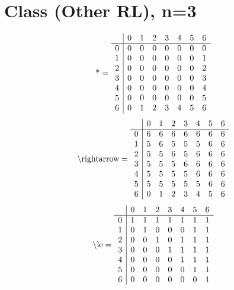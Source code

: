 \documentclass[11pt]{article}
\begin{document}
\section{Class (Other RL), n=3}
\[\text{*} = 
\begin{array}{r | r r r r r r r}
 & 0 & 1 & 2 & 3 & 4 & 5 & 6 \\ \hline
0 & 0 & 0 & 0 & 0 & 0 & 0 & 0 \\
1 & 0 & 0 & 0 & 0 & 0 & 0 & 1 \\
2 & 0 & 0 & 0 & 0 & 0 & 0 & 2 \\
3 & 0 & 0 & 0 & 0 & 0 & 0 & 3 \\
4 & 0 & 0 & 0 & 0 & 0 & 0 & 4 \\
5 & 0 & 0 & 0 & 0 & 0 & 0 & 5 \\
6 & 0 & 1 & 2 & 3 & 4 & 5 & 6 \\
\end{array}
\]
\[\text{\textbackslash rightarrow} = 
\begin{array}{r | r r r r r r r}
 & 0 & 1 & 2 & 3 & 4 & 5 & 6 \\ \hline
0 & 6 & 6 & 6 & 6 & 6 & 6 & 6 \\
1 & 5 & 6 & 5 & 5 & 5 & 6 & 6 \\
2 & 5 & 5 & 6 & 5 & 6 & 6 & 6 \\
3 & 5 & 5 & 5 & 6 & 6 & 6 & 6 \\
4 & 5 & 5 & 5 & 5 & 6 & 6 & 6 \\
5 & 5 & 5 & 5 & 5 & 5 & 6 & 6 \\
6 & 0 & 1 & 2 & 3 & 4 & 5 & 6 \\
\end{array}
\]
\[\text{\textbackslash le} = 
\begin{array}{r | r r r r r r r}
 & 0 & 1 & 2 & 3 & 4 & 5 & 6 \\ \hline
0 & 1 & 1 & 1 & 1 & 1 & 1 & 1 \\
1 & 0 & 1 & 0 & 0 & 0 & 1 & 1 \\
2 & 0 & 0 & 1 & 0 & 1 & 1 & 1 \\
3 & 0 & 0 & 0 & 1 & 1 & 1 & 1 \\
4 & 0 & 0 & 0 & 0 & 1 & 1 & 1 \\
5 & 0 & 0 & 0 & 0 & 0 & 1 & 1 \\
6 & 0 & 0 & 0 & 0 & 0 & 0 & 1 \\
\end{array}
\]
\end{document}
